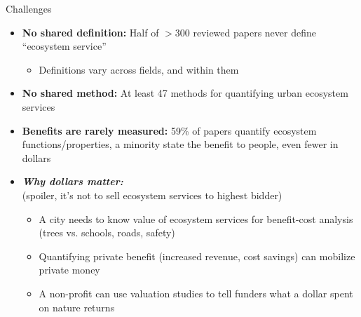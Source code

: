 \documentclass[aspectratio=169]{beamer}
\newcommand{\smallcite}[1]{\begingroup\scriptsize\citep{#1}\endgroup}
\begin{document}
\begin{frame}{Challenges}
    \begin{itemize}
        \item \textbf{No shared definition:} Half of $>$300 reviewed papers never define ``ecosystem service'' \smallcite{tanConceptualFrameworkUntangle2020}
        \begin{itemize}
            \item Definitions vary across fields, and within them \smallcite{boydWhatAreEcosystem2007}
        \end{itemize}
        \pause \item \textbf{No shared method:} At least 47 methods for quantifying urban ecosystem services \smallcite{maReviewMethodsQuantifying2025}
        \pause \item \textbf{Benefits are rarely measured:} 59\% of papers quantify ecosystem functions/properties, a minority state the benefit to people, even fewer in dollars \smallcite{veerkampReviewStudiesAssessing2021}
        \pause \item \textbf{\textit{Why dollars matter:}} \\
        (spoiler, it's not to sell ecosystem services to highest bidder)
        \begin{itemize}
            \item A city needs to know value of ecosystem services for benefit-cost analysis \\
            (trees vs. schools, roads, safety)
            \item Quantifying private benefit (increased revenue, cost savings) can mobilize private money 
            \item A non-profit can use valuation studies to tell funders what a dollar spent on nature returns
        \end{itemize}
    \end{itemize}
\end{frame}

\end{document}
